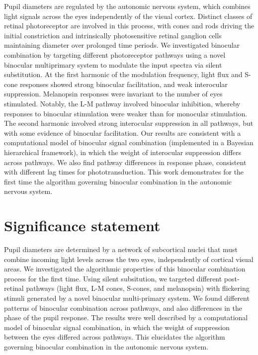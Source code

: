 \documentclass[
]{article}
\begin{document}
Pupil diameters are regulated by the autonomic nervous system, which combines light signals across the eyes independently of the visual cortex. Distinct classes of retinal photoreceptor are involved in this process, with cones and rods driving the initial constriction and intrinsically photosensitive retinal ganglion cells maintaining diameter over prolonged time periods. We investigated binocular combination by targeting different photoreceptor pathways using a novel binocular multiprimary system to modulate the input spectra via silent substitution. At the first harmonic of the modulation frequency, light flux and S-cone responses showed strong binocular facilitation, and weak interocular suppression. Melanopsin responses were invariant to the number of eyes stimulated. Notably, the L-M pathway involved binocular inhibition, whereby responses to binocular stimulation were weaker than for monocular stimulation. The second harmonic involved strong interocular suppression in all pathways, but with some evidence of binocular facilitation. Our results are consistent with a computational model of binocular signal combination (implemented in a Bayesian hierarchical framework), in which the weight of interocular suppression differs across pathways. We also find pathway differences in response phase, consistent with different lag times for phototransduction. This work demonstrates for the first time the algorithm governing binocular combination in the autonomic nervous system.

\section{Significance statement}\label{significance-statement}

Pupil diameters are determined by a network of subcortical nuclei that must combine incoming light levels across the two eyes, independently of cortical visual areas. We investigated the algorithmic properties of this binocular combination process for the first time. Using silent subsitution, we targeted different post-retinal pathways (light flux, L-M cones, S-cones, and melanopsin) with flickering stimuli generated by a novel binocular multi-primary system. We found different patterns of binocular combination across pathways, and also differences in the phase of the pupil response. The results were well described by a computational model of binocular signal combination, in which the weight of suppression between the eyes differed across pathways. This elucidates the algorithm governing binocular combination in the autonomic nervous system.
\end{document}
